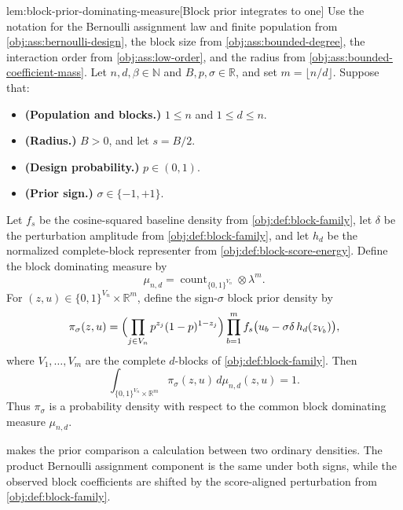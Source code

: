 \begin{lemmav}{lem:block-prior-dominating-measure}[Block prior integrates to one]
Use the notation for the Bernoulli assignment law and finite population from \cref{obj:ass:bernoulli-design}, the block size from \cref{obj:ass:bounded-degree}, the interaction order from \cref{obj:ass:low-order}, and the radius from \cref{obj:ass:bounded-coefficient-mass}. Let \(n,d,\beta\in\mathbb N\) and \(B,p,\sigma\in\mathbb R\), and set \(m=\lfloor n/d\rfloor\). Suppose that:
\begin{itemize}
\item \textbf{(Population and blocks.)} \(1\le n\) and \(1\le d\le n\).
\item \textbf{(Radius.)} \(B>0\), and let \(s=B/2\).
\item \textbf{(Design probability.)} \(p\in(0,1)\).
\item \textbf{(Prior sign.)} \(\sigma\in\{-1,+1\}\).
\end{itemize}
Let \(f_s\) be the cosine-squared baseline density from \cref{obj:def:block-family}, let \(\delta\) be the perturbation amplitude from \cref{obj:def:block-family}, and let \(h_d\) be the normalized complete-block representer from \cref{obj:def:block-score-energy}. Define the block dominating measure by
\[
\mu_{n,d}
=
\operatorname{count}_{\{0,1\}^{V_n}}\otimes \lambda^m .
\]
For \((z,u)\in\{0,1\}^{V_n}\times\mathbb R^m\), define the sign-\(\sigma\) block prior density by
\[
\pi_\sigma(z,u)
=
\Bigl(\prod_{j\in V_n} p^{z_j}(1-p)^{1-z_j}\Bigr)
\prod_{b=1}^{m}
f_s\bigl(u_b-\sigma\delta\,h_d(z_{V_b})\bigr),
\]
where \(V_1,\ldots,V_m\) are the complete \(d\)-blocks of \cref{obj:def:block-family}. Then
\[
\int_{\{0,1\}^{V_n}\times\mathbb R^m}\pi_\sigma(z,u)\,d\mu_{n,d}(z,u)=1.
\]
Thus \(\pi_\sigma\) is a probability density with respect to the common block dominating measure \(\mu_{n,d}\).
\end{lemmav}

 makes the prior comparison a calculation between two ordinary densities. The product Bernoulli assignment component is the same under both signs, while the observed block coefficients are shifted by the score-aligned perturbation from \cref{obj:def:block-family}.


